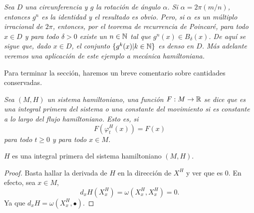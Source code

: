 \begin{ejemplo}
  \em
  Sea $D$ una circunferencia y $g$ la rotación de ángulo $\alpha$. Si $\alpha=2\pi(m/n)$, entonces $g^n$ es la identidad y el resultado es obvio. Pero, si $\alpha$ es un múltiplo irracional de $2\pi$, entonces, por el teorema de recurrencia de Poincaré, para todo $x\in D$ y para todo $\delta>0$ existe un $n\in \mathbb{N}$ tal que $g^n(x) \in B_{\delta}(x)$.
  De aquí se sigue que, dado $x \in D$, el conjunto $\{g^k(x)|k\in \mathbb{N}\}$ es denso en $D$. Más adelante veremos una aplicación de este ejemplo a mecánica hamiltoniana.

\end{ejemplo}

Para terminar la sección, haremos un breve comentario sobre cantidades conservadas.
\begin{defn}
  \em
  Sea $(M,H)$ un sistema hamiltoniano, una función $F:M \rightarrow \mathbb{R}$ se dice que es una \emph{integral primera} del sistema o una \emph{constante del movimiento} si es constante a lo largo del flujo hamiltoniano. Esto es, si
  \begin{equation*}
    F(\varphi^H_t(x))=F(x)
  \end{equation*}
  para todo $t \geq 0$ y para todo $x \in M$.
  \begin{prop}
    $H$ es una integral primera del sistema hamiltoniano $(M,H)$.
  \end{prop}
  \begin{proof}
    Basta hallar la derivada de $H$ en la dirección de $X^H$ y ver que es 0. En efecto, sea $x \in M$,
    \begin{equation*}
      d_xH(X_x^H) = \omega(X_x^H,X_x^H)=0.
    \end{equation*}
    Ya que $d_xH=\omega(X_x^H,\bullet)$.
  \end{proof}
\end{defn}

